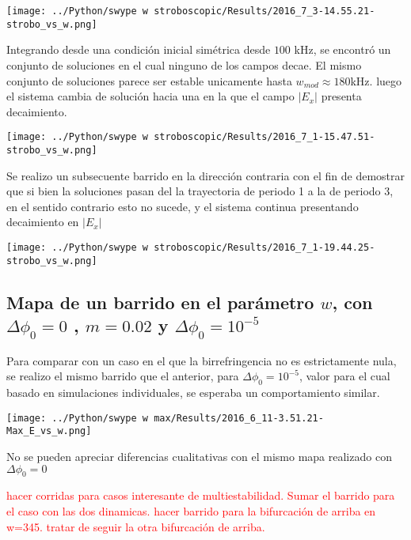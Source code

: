 		
		\begin{center}
			\texttt{[image: ../Python/swype w stroboscopic/Results/2016\_7\_3-14.55.21-strobo\_vs\_w.png]}
		\end{center}
		
	
		Integrando desde una condición inicial simétrica desde $100$ kHz, se encontró un conjunto de soluciones en el cual ninguno de los campos decae. El mismo conjunto de soluciones parece ser estable unicamente hasta $w_{mod} \approx 180 $kHz. luego el sistema cambia de solución hacia una en la que el campo $|E_x|$ presenta decaimiento.
		
		\begin{center}
			\texttt{[image: ../Python/swype w stroboscopic/Results/2016\_7\_1-15.47.51-strobo\_vs\_w.png]}
		\end{center}
	
		Se realizo un subsecuente barrido en la dirección contraria con el fin de demostrar que si bien la soluciones pasan del la trayectoria de periodo 1 a la de periodo 3, en el sentido contrario esto no sucede, y el sistema continua presentando decaimiento en $|E_x|$
		
		\begin{center}
			\texttt{[image: ../Python/swype w stroboscopic/Results/2016\_7\_1-19.44.25-strobo\_vs\_w.png]}
		\end{center}
		
		
	\subsection{Mapa de un barrido en el parámetro $w$, con $\Delta \phi_0 =0 $ , $m=0.02$ y $\Delta \phi_0=10^{-5}$}
			
			Para comparar con un caso en el que la birrefringencia no es estrictamente nula, se realizo el mismo barrido que el anterior, para $\Delta \phi_0 =10^{-5} $, valor para el cual basado en simulaciones individuales, se esperaba un comportamiento similar.
			
					
			\begin{center}
				\texttt{[image: ../Python/swype w max/Results/2016\_6\_11-3.51.21-Max\_E\_vs\_w.png]}
			\end{center}
		
			No se pueden apreciar diferencias cualitativas con el mismo mapa realizado con $\Delta \phi_0=0$
			
		
		\textcolor{red}{hacer corridas para casos interesante de multiestabilidad. Sumar el barrido para el caso con las dos dinamicas. hacer barrido para la bifurcación de arriba en w=345. tratar de seguir la otra bifurcación de arriba.}			 
		
